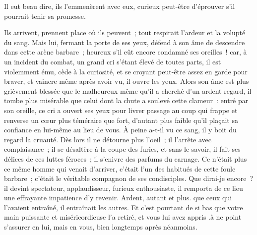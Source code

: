 \documentclass[french,twoside]{book} %
\begin{document}
\noindent Il eut beau dire, ils l’emmenèrent avec eux, curieux peut-être d’éprouver s’il pourrait tenir sa promesse.\par
Ils arrivent, prennent place où ils peuvent ; tout respirait l’ardeur et la volupté du sang. Mais lui, fermant la porte de ses yeux, défend à son âme de descendre dans cette arène barbare ; heureux s’il eût encore condamné ses oreilles ! car, à un incident du combat, un grand cri s’étant élevé de toutes parts, il est violemment ému, cède à la curiosité, et se croyant peut-être assez en garde pour braver, et vaincre même après avoir vu, il ouvre les yeux. Alors son âme est plus grièvement blessée que le malheureux même qu’il a cherché d’un ardent regard, il tombe plus misérable que celui dont la chute a soulevé cette clameur : entré par son oreille, ce cri a ouvert ses yeux pour livrer passage au coup qui frappe et renverse un cœur plus téméraire que fort, d’autant plus faible qu’il plaçait sa confiance en lui-même au lieu de vous. À peine a-t-il vu ce sang, il y boit du regard la cruauté. Dès lors il ne détourne plus l’oeil ; il l’arrête avec complaisance ; il se désaltère à la coupe des furies, et sans le savoir, il fait ses délices de ces luttes féroces ; il s’enivre des parfums du carnage. Ce n’était plus ce même homme qui venait d’arriver, c’était l’un des habitués de cette foule barbare ; c’était le véritable compagnon de ses condisciples. Que dirai-je encore ? il devint spectateur, applaudisseur, furieux enthousiaste, il remporta de ce lieu une effrayante impatience d’y revenir. Ardent, autant et plus. que ceux qui l’avaient entraîné, il entraînait les autres. Et c’est pourtant de si bas que votre main puissante et miséricordieuse l’a retiré, et vous lui avez appris .à ne point s’assurer en lui, mais en vous, bien longtemps après néanmoins.
\end{document}
